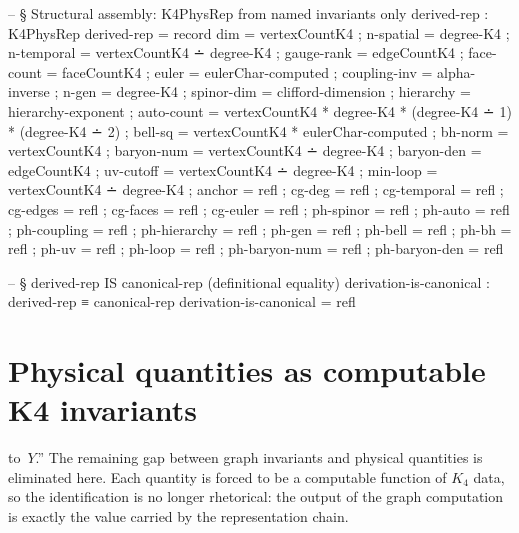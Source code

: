 \documentclass[11pt,a4paper]{book}
\def\texorpdfstring#1#2{#2}%
\begin{document}
\begin{code}
  -- § Structural assembly: K4PhysRep from named invariants only
  derived-rep : K4PhysRep
  derived-rep = record
    { dim          = vertexCountK4
    ; n-spatial    = degree-K4
    ; n-temporal   = vertexCountK4 ∸ degree-K4
    ; gauge-rank   = edgeCountK4
    ; face-count   = faceCountK4
    ; euler        = eulerChar-computed
    ; coupling-inv = alpha-inverse
    ; n-gen        = degree-K4
    ; spinor-dim   = clifford-dimension
    ; hierarchy    = hierarchy-exponent
    ; auto-count   = vertexCountK4 * degree-K4
                   * (degree-K4 ∸ 1) * (degree-K4 ∸ 2)
    ; bell-sq      = vertexCountK4 * eulerChar-computed
    ; bh-norm      = vertexCountK4
    ; baryon-num   = vertexCountK4 ∸ degree-K4
    ; baryon-den   = edgeCountK4
    ; uv-cutoff    = vertexCountK4 ∸ degree-K4
    ; min-loop     = vertexCountK4 ∸ degree-K4
    ; anchor       = refl
    ; cg-deg       = refl
    ; cg-temporal  = refl
    ; cg-edges     = refl
    ; cg-faces     = refl
    ; cg-euler     = refl
    ; ph-spinor    = refl
    ; ph-auto      = refl
    ; ph-coupling  = refl
    ; ph-hierarchy = refl
    ; ph-gen       = refl
    ; ph-bell      = refl
    ; ph-bh        = refl
    ; ph-uv        = refl
    ; ph-loop      = refl
    ; ph-baryon-num = refl
    ; ph-baryon-den = refl
    }

  -- § derived-rep IS canonical-rep (definitional equality)
  derivation-is-canonical : derived-rep ≡ canonical-rep
  derivation-is-canonical = refl
\end{code}


\section{Physical quantities as computable \texorpdfstring{$K_4$}{K4} invariants}

to~$Y$.''
The remaining gap between graph invariants and physical quantities is eliminated here. Each quantity is forced to be a computable function of $K_4$ data, so the identification is no longer rhetorical: the output of the graph computation is exactly the value carried by the representation chain.
\end{document}
